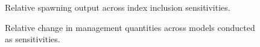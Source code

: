 \documentclass[
]{scrartcl}
\begin{document}
\begin{figure}


\caption{\label{fig-sens_indices_status}Relative spawning output across
index inclusion sensitivities.}

\end{figure}%

\clearpage

\begin{figure}


\caption{\label{fig-sens_sum}Relative change in management quantities
across models conducted as sensitivities.}

\end{figure}%
\end{document}
